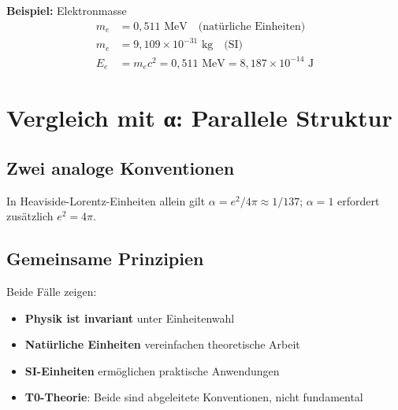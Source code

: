 	\textbf{Beispiel:} Elektronmasse
	\begin{align}
		m_e &= 0{,}511 \text{ MeV} \quad \text{(natürliche Einheiten)} \\
		m_e &= 9{,}109 \times 10^{-31} \text{ kg} \quad \text{(SI)} \\
		E_e &= m_e c^2 = 0{,}511 \text{ MeV} = 8{,}187 \times 10^{-14} \text{ J}
	\end{align}
	
	\section{Vergleich mit α: Parallele Struktur}
	
	\subsection{Zwei analoge Konventionen}
	
	\begin{table}[h]
		\centering
		\caption{Parallele Struktur: α und c als Konventionen}
		{\footnotesize In Heaviside-Lorentz-Einheiten allein gilt $\alpha = e^2/4\pi \approx 1/137$; $\alpha = 1$ erfordert zusätzlich $e^2 = 4\pi$.}
	\end{table}
	
	\subsection{Gemeinsame Prinzipien}
	
	Beide Fälle zeigen:
	\begin{itemize}
		\item \textbf{Physik ist invariant} unter Einheitenwahl
		\item \textbf{Natürliche Einheiten} vereinfachen theoretische Arbeit
		\item \textbf{SI-Einheiten} ermöglichen praktische Anwendungen
		\item \textbf{T0-Theorie}: Beide sind abgeleitete Konventionen, nicht fundamental
	\end{itemize}
	
